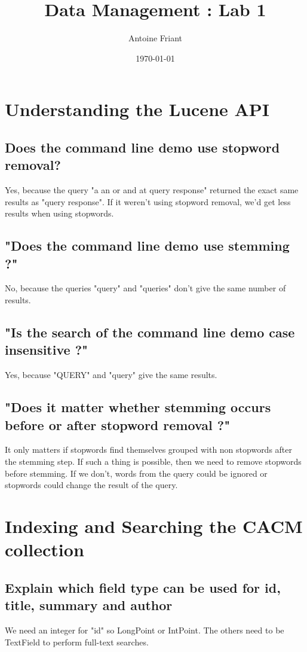 \documentclass[11pt,a4paper,twoside,svgnames]{article}
\title{\color{DarkGreen}\huge\bfseries Data Management : Lab 1}
\author{Antoine Friant}
\date{\today}
\begin{document}
	
	\maketitle
	
	\section{Understanding the Lucene API}
	
	\subsection{Does the command line demo use stopword removal?}
	Yes, because the query "a an or and at query response" returned the exact same results as "query response". If it weren't using stopword removal, we'd get less results when using stopwords.
	
	\subsection{"Does the command line demo use stemming ?"}
	No, because the queries "query" and "queries" don't give the same number of results.
	
	\subsection{"Is the search of the command line demo case insensitive ?"}
	Yes, because "QUERY" and "query" give the same results.
	
	\subsection{"Does it matter whether stemming occurs before or after stopword removal ?"}
	It only matters if stopwords find themselves grouped with non stopwords after the stemming step. If such a thing is possible, then we need to remove stopwords before stemming. If we don't, words from the query could be ignored or stopwords could change the result of the query.
	
	\section{Indexing and Searching the CACM collection}
	\subsection{Explain which field type can be used for id, title, summary and author}
	We need an integer for "id" so LongPoint or IntPoint. The others need to be TextField to perform full-text searches.
	
	
	
	
\end{document}
